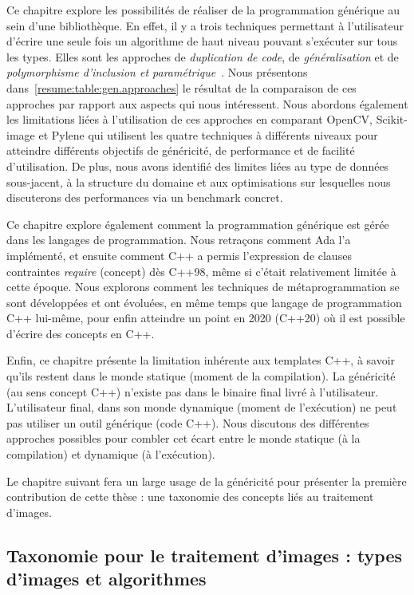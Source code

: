 Ce chapitre explore les possibilités de réaliser de la programmation générique au sein d'une bibliothèque. En effet, il
y a trois techniques permettant à l'utilisateur d'écrire une seule fois un algorithme de haut niveau pouvant s'exécuter
sur tous les types. Elles sont les approches de \emph{duplication de code}, de \emph{généralisation} et de
\emph{polymorphisme d'inclusion et paramétrique}~\parencite{gibbons.2007.datatype}. Nous présentons
dans~\cref{resume:table:gen.approaches} le résultat de la comparaison de ces approches par rapport aux aspects qui nous
intéressent. Nous abordons également les limitations liées à l'utilisation de ces approches en comparant OpenCV,
Scikit-image et Pylene qui utilisent les quatre techniques à différents niveaux pour atteindre différents objectifs de
généricité, de performance et de facilité d'utilisation. De plus, nous avons identifié des limites liées au type de
données sous-jacent, à la structure du domaine et aux optimisations sur lesquelles nous discuterons des performances via
un benchmark concret.

Ce chapitre explore également comment la programmation générique est gérée dans les langages de programmation. Nous
retraçons comment Ada l'a implémenté, et ensuite comment C++ a permis l'expression de clauses contraintes \emph{require}
(concept) dès C++98, même si c'était relativement limitée à cette époque. Nous explorons comment les techniques de
métaprogrammation se sont développées et ont évoluées, en même temps que langage de programmation C++ lui-même, pour
enfin atteindre un point en 2020 (C++20) où il est possible d'écrire des concepts en C++.

Enfin, ce chapitre présente la limitation inhérente aux templates C++, à savoir qu'ils restent dans le monde statique
(moment de la compilation). La généricité (au sens concept C++) n'existe pas dans le binaire final livré à
l'utilisateur. L'utilisateur final, dans son monde dynamique (moment de l'exécution) ne peut pas utiliser un outil
générique (code C++). Nous discutons des différentes approches possibles pour combler cet écart entre le monde statique
(à la compilation) et dynamique (à l'exécution).

Le chapitre suivant fera un large usage de la généricité pour présenter la première contribution de cette thèse : une
taxonomie des concepts liés au traitement d'images.


\subsection*{Taxonomie pour le traitement d'images : types d'images et algorithmes}


